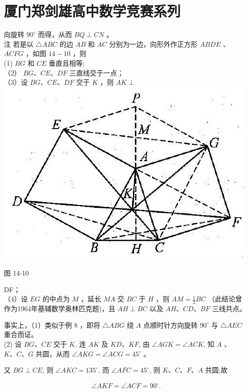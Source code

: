 \documentclass[10pt]{article}
\begin{document}
\section*{厦门郑剑雄高中数学竞赛系列}
向旋转 $90^{\circ}$ 而得，从而 $B Q \perp C N$ 。\\
注 若是以 $\triangle A B C$ 的边 $A B$ 和 $A C$ 分别为一边，向形外作正方形 $A B D E$ 、 $A C F G$ ，如图 $14-10$ ，则\\
(1) $B G$ 和 $C E$ 垂直且相等;\\
（2） $B G 、 C E 、 D F$ 三直线交于一点；\\
（3）设 $B G 、 C E 、 D F$ 交于 $K$ ，则 $A K \perp$\\
\includegraphics[max width=\textwidth, center]{2024_10_30_2c8f45efd4a519b08e1ag-132}

图 14-10

DF；\\
（4）设 $E G$ 的中点为 $M$ ，延长 $M A$ 交 $B C$ 于 $H$ ，则 $A M=\frac{1}{2} B C$ （此结论曾作为1964年基辅数学奥林匹克题)，且 $A H \perp B C$ 以及 $A H 、 C D 、 B F$ 三线共点。

事实上，（1）类似于例 8 ，即将 $\triangle A B G$ 绕 $A$ 点顺时针方向旋转 $90^{\circ}$ 与 $\triangle A E C$ 重合而证。\\
(2) 设 $B G 、 C E$ 交于 $K$, 连 $A K$ 及 $K D 、 K F$, 由 $\angle A G K=\angle A C K$, 知 $A$ 、 $K 、 C 、 G$ 共圆，从而 $\angle A K G=\angle A C G=45^{\circ}$ 。

又 $B G \perp C E$, 则 $\angle A K C=135^{\circ}$, 而 $\angle A F C=45^{\circ}$, 则 $K 、 C 、 F 、 A$ 共圆,故

\begin{align*}
\angle A K F=\angle A C F=90^{\circ} .
\end{align*}
\end{document}
